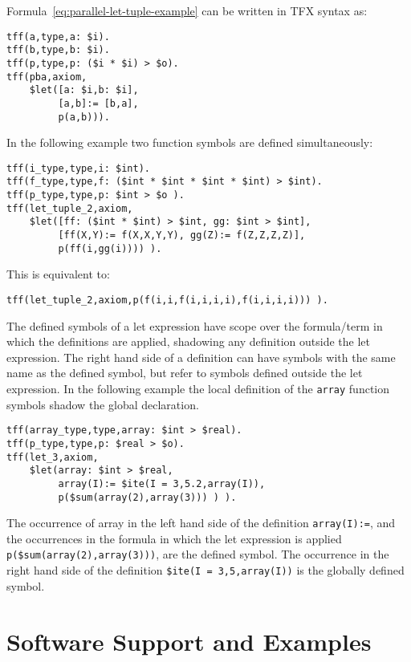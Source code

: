 \documentclass{easychair}
\begin{document}
Formula~\ref{eq:parallel-let-tuple-example} can be written in TFX syntax as:
\begin{verbatim}
tff(a,type,a: $i).
tff(b,type,b: $i).
tff(p,type,p: ($i * $i) > $o).
tff(pba,axiom,
    $let([a: $i,b: $i],
         [a,b]:= [b,a],
         p(a,b))).
\end{verbatim}

In the following example two function symbols are defined simultaneously:
\begin{verbatim}
tff(i_type,type,i: $int).
tff(f_type,type,f: ($int * $int * $int * $int) > $int).
tff(p_type,type,p: $int > $o ).
tff(let_tuple_2,axiom,
    $let([ff: ($int * $int) > $int, gg: $int > $int],
         [ff(X,Y):= f(X,X,Y,Y), gg(Z):= f(Z,Z,Z,Z)],
         p(ff(i,gg(i)))) ).
\end{verbatim}
This is equivalent to:
\begin{verbatim}
tff(let_tuple_2,axiom,p(f(i,i,f(i,i,i,i),f(i,i,i,i))) ).
\end{verbatim}

The defined symbols of a let expression have scope over the formula/term in 
which the definitions are applied, shadowing any definition outside the let 
expression. 
The right hand side of a definition can have symbols with the same name as 
the defined symbol, but refer to symbols defined outside the let expression. 
In the following example the local definition of the {\tt array} function 
symbols shadow the global declaration.
\begin{verbatim}
tff(array_type,type,array: $int > $real).
tff(p_type,type,p: $real > $o).
tff(let_3,axiom,
    $let(array: $int > $real,
         array(I):= $ite(I = 3,5.2,array(I)),
         p($sum(array(2),array(3))) ) ).
\end{verbatim}

The occurrence of array in the left hand side of the definition 
{\tt array(I):=}, and the occurrences in the formula in which the let 
expression is applied {\tt p(\$sum(array(2),array(3)))}, are the defined 
symbol. 
The occurrence in the right hand side of the definition 
{\tt \$ite(I = 3,5,array(I))} is the globally defined symbol.

\section{Software Support and Examples}
\label{ImplementationExamples}

\end{document}

